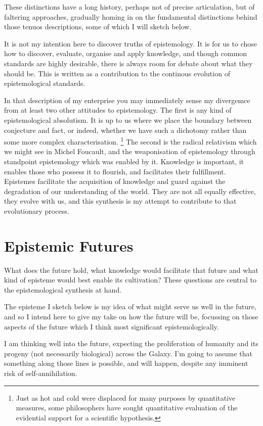 \documentclass[10pt,titlepage]{article}
\begin{document}
These distinctions have a long history, perhaps not of precise articulation, but of faltering approaches, gradually homing in on the fundamental distinctions behind those tenuos descriptions, some of which I will sketch below.

It is not my intention here to discover truths of epistemology.
It is for us to chose how to discover, evaluate, organise and apply knowledge, and though common standards are highly desirable, there is always room for debate about what they should be.
This is written as a contribution to the continous evolution of epistemological standards.

In that description of my enterprise you may immediately sense my divergemce from at least two other attitudes to epistemology.
The first is any kind of epistemological absolutism.
It is up to us where we place the boundary between conjecture and fact, or indeed, whether we have such a dichotomy rather than some more complex characterisation.
\footnote{Just as hot and cold were displaced for many purposes by quantitative measures, some philosophers have sought quantitative evaluation of the evidential support for a scientific hypothesis.}
The second is the radical relativism which we might see in Michel Foucault, and the weaponisation of epistemology through standpoint epistemology which was enabled by it.
Knowledge is important, it enables those who possess it to flourish, and facilitates their fulfillment.
Epistemes facilitate the acquisition of knowledge and guard against the degradation of our understanding of the world.
They are not all equally effective, they evolve with us, and this synthesis is my attempt to contribute to that evolutionary process.

\section{Epistemic Futures}

What does the future hold, what knowledge would facilitate that future and what kind of episteme would best enable its cultivation?
These questions are central to the epistemological synthesis at hand.

The episteme I sketch below is my idea of what might serve us well in the future, and so I intend here to give my take on how the future will be, focussing on those aspects of the future which I think most significant epistemologically.

I am thinking well into the future, expecting the proliferation of humanity and its progeny (not necessarily biological) across the Galaxy.
I'm going to assume that something along those lines is possible, and will happen, despite any imminent risk of self-annihilation.
\end{document}
